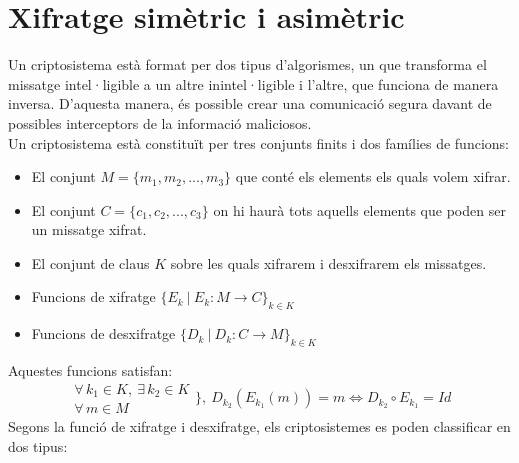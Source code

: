 \documentclass{article}
\begin{document}
\section{Xifratge simètric i asimètric}
Un criptosistema està format per dos tipus d'algorismes, un que transforma el
missatge intel·ligible a un altre inintel·ligible i l'altre, que funciona de manera inversa. D'aquesta manera, és possible crear una comunicació segura davant de possibles interceptors de la informació maliciosos.
\\
Un criptosistema està constituït per tres conjunts finits i dos famílies de funcions:
\begin{itemize}
	\item El conjunt $M = \{m_1, m_2, ..., m_3\}$ que conté els elements els quals volem xifrar.
	\item El conjunt $C = \{c_1, c_2, ..., c_3\}$ on hi haurà tots aquells elements que poden ser un missatge xifrat.
	\item El conjunt de claus $K$ sobre les quals xifrarem i desxifrarem els missatges.
	\item Funcions de xifratge $\{E_k \ | \ E_k : M \rightarrow C \}_{k \in K} $
	\item Funcions de desxifratge $\{D_k \ | \ D_k : C \rightarrow M \}_{k \in K}$
\end{itemize}
Aquestes funcions satisfan:
\[ \begin{array}{l}
	\forall \, k_1 \in K, \ \exists \, k_2 \in K\\
	\forall \, m \in M
\end{array} \Bigg\}, \ D_{k_2}(E_{k_1}(m)) = m \Longleftrightarrow D_{k_2} \circ E_{k_1} =  Id\]
Segons la funció de xifratge i desxifratge, els criptosistemes es poden classificar en dos tipus:
\end{document}
